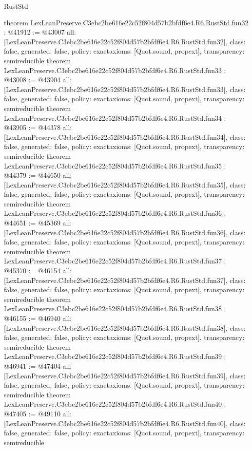 \begin{lexlean}{RustStd}
\begin{coremodule}
{}
theorem LexLeanPreserve.C3ebc2be616e22c52f804d57b2bfdf6e4.R6.RustStd.fun32 : @41912 := @43007 {
  all: [LexLeanPreserve.C3ebc2be616e22c52f804d57b2bfdf6e4.R6.RustStd.fun32],
  class: false,
  generated: false,
  policy: exact{axioms: [Quot.sound, propext]},
  transparency: semireducible
}
theorem LexLeanPreserve.C3ebc2be616e22c52f804d57b2bfdf6e4.R6.RustStd.fun33 : @43008 := @43904 {
  all: [LexLeanPreserve.C3ebc2be616e22c52f804d57b2bfdf6e4.R6.RustStd.fun33],
  class: false,
  generated: false,
  policy: exact{axioms: [Quot.sound, propext]},
  transparency: semireducible
}
theorem LexLeanPreserve.C3ebc2be616e22c52f804d57b2bfdf6e4.R6.RustStd.fun34 : @43905 := @44378 {
  all: [LexLeanPreserve.C3ebc2be616e22c52f804d57b2bfdf6e4.R6.RustStd.fun34],
  class: false,
  generated: false,
  policy: exact{axioms: [Quot.sound, propext]},
  transparency: semireducible
}
theorem LexLeanPreserve.C3ebc2be616e22c52f804d57b2bfdf6e4.R6.RustStd.fun35 : @44379 := @44650 {
  all: [LexLeanPreserve.C3ebc2be616e22c52f804d57b2bfdf6e4.R6.RustStd.fun35],
  class: false,
  generated: false,
  policy: exact{axioms: [Quot.sound, propext]},
  transparency: semireducible
}
theorem LexLeanPreserve.C3ebc2be616e22c52f804d57b2bfdf6e4.R6.RustStd.fun36 : @44651 := @45369 {
  all: [LexLeanPreserve.C3ebc2be616e22c52f804d57b2bfdf6e4.R6.RustStd.fun36],
  class: false,
  generated: false,
  policy: exact{axioms: [Quot.sound, propext]},
  transparency: semireducible
}
theorem LexLeanPreserve.C3ebc2be616e22c52f804d57b2bfdf6e4.R6.RustStd.fun37 : @45370 := @46154 {
  all: [LexLeanPreserve.C3ebc2be616e22c52f804d57b2bfdf6e4.R6.RustStd.fun37],
  class: false,
  generated: false,
  policy: exact{axioms: [Quot.sound, propext]},
  transparency: semireducible
}
theorem LexLeanPreserve.C3ebc2be616e22c52f804d57b2bfdf6e4.R6.RustStd.fun38 : @46155 := @46940 {
  all: [LexLeanPreserve.C3ebc2be616e22c52f804d57b2bfdf6e4.R6.RustStd.fun38],
  class: false,
  generated: false,
  policy: exact{axioms: [Quot.sound, propext]},
  transparency: semireducible
}
theorem LexLeanPreserve.C3ebc2be616e22c52f804d57b2bfdf6e4.R6.RustStd.fun39 : @46941 := @47404 {
  all: [LexLeanPreserve.C3ebc2be616e22c52f804d57b2bfdf6e4.R6.RustStd.fun39],
  class: false,
  generated: false,
  policy: exact{axioms: [Quot.sound, propext]},
  transparency: semireducible
}
theorem LexLeanPreserve.C3ebc2be616e22c52f804d57b2bfdf6e4.R6.RustStd.fun40 : @47405 := @49110 {
  all: [LexLeanPreserve.C3ebc2be616e22c52f804d57b2bfdf6e4.R6.RustStd.fun40],
  class: false,
  generated: false,
  policy: exact{axioms: [Quot.sound, propext]},
  transparency: semireducible
}
\end{coremodule}
\end{lexlean}
